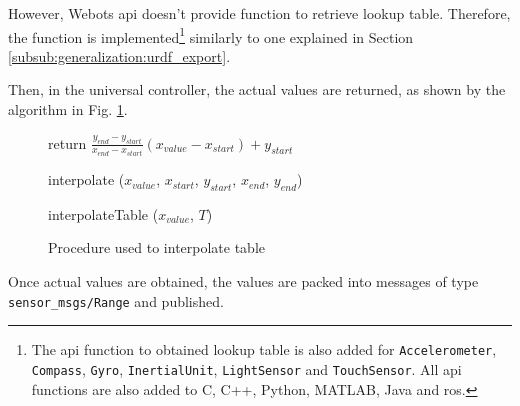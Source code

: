 However, Webots \ac{api} doesn't provide function to retrieve lookup table. Therefore, the function is implemented\footnote{The \ac{api} function to obtained lookup table is also added for \texttt{Accelerometer}, \texttt{Compass}, \texttt{Gyro}, \texttt{InertialUnit}, \texttt{LightSensor} and \texttt{TouchSensor}. All \ac{api} functions are also added to C, C++, Python, MATLAB, Java and \ac{ros}.} similarly to one explained in Section \ref{subsub:generalization:urdf_export}.

Then, in the universal controller, the actual values are returned, as shown by the algorithm in Fig. \ref{fig:generalization:interopolation}.

\begin{figure}[H]
    \begin{minipage}{\linewidth}
    \begin{procedure}[H]
        return $ \frac{y_{end} - y_{start}}{x_{end} - x_{start}} (x_{value} - x_{start}) + y_{start}
 $ \;
        \caption{interpolate ($x_{value}$, $x_{start}$, $y_{start}$, $x_{end}$, $y_{end}$)}
    \end{procedure}
    \end{minipage}
    \begin{minipage}{\linewidth}
    \begin{procedure}[H]


        \caption{interpolateTable ($x_{value}$, $T$)}
    \end{procedure}
    \end{minipage}
\caption{Procedure used to interpolate table}
\label{fig:generalization:interopolation}
\end{figure}

Once actual values are obtained, the values are packed into messages of type \texttt{sensor\_msgs/Range} and published.

